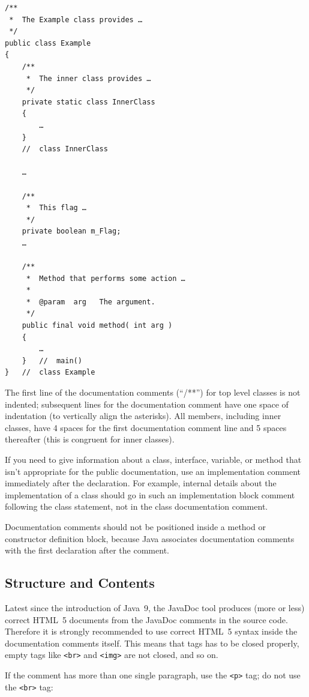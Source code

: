 \documentclass[11pt,a4paper, titlepage, parskip=half, headsepline, footsepline, cleardoublepage=current, headheight=1cm]{scrbook}
\begin{document}
\begin{lstlisting}
/**
 *  The Example class provides …
 */
public class Example
{
    /**
     *  The inner class provides …
     */
    private static class InnerClass
    {
        …
    }
    //  class InnerClass
     
    …
    
    /**
     *  This flag …
     */
    private boolean m_Flag;
    …

    /**
     *  Method that performs some action …
     *
     *  @param  arg   The argument.
     */
    public final void method( int arg )
    {
        …
    }   //  main()
}   //  class Example
\end{lstlisting}

The first line of the documentation comments (“/**”) for top level classes is not indented; subsequent lines for the documentation comment have one space of indentation (to vertically align the asterisks). All members, including inner classes, have 4 spaces for the first documentation comment line and 5 spaces thereafter (this is congruent for inner classes).

If you need to give information about a class, interface, variable, or method that isn't appropriate for the public documentation, use an implementation comment immediately after the declaration. For example, internal details about the implementation of a class should go in such an implementation block comment following the class statement, not in the class documentation comment.

Documentation comments should not be positioned inside a method or constructor definition block, because Java associates documentation comments with the first declaration after the comment.

\subsection{Structure and Contents}\label{sec:StructureAndContents}
Latest since the introduction of Java~9, the JavaDoc tool produces (more or less) correct HTML~5 documents from the JavaDoc comments in the source code. Therefore it is strongly recommended to use correct HTML~5 syntax inside the documentation comments itself. This means that tags has to be closed properly, empty tags like \lstinline|<br>| and \lstinline|<img>| are not closed, and so on.

If the comment has more than one single paragraph, use the \lstinline|<p>| tag; do not use the \lstinline|<br>| tag:
\end{document}
